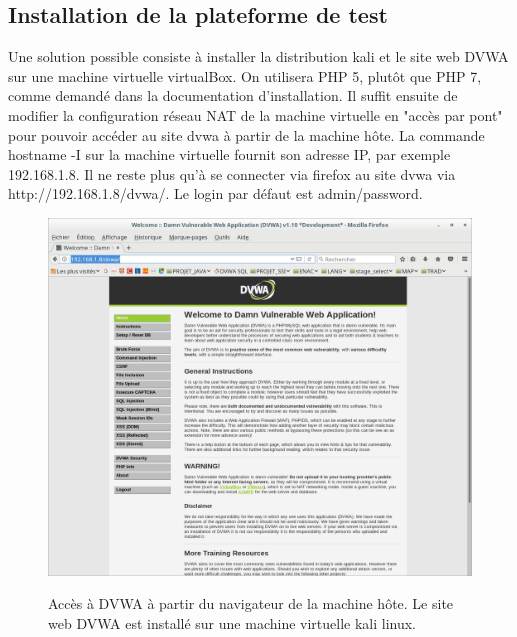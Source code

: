 \subsection*{Installation de la plateforme de test}
Une solution possible consiste à installer la distribution kali et le site web DVWA sur une machine virtuelle virtualBox. On utilisera PHP 5, plutôt que PHP 7, comme demandé dans la documentation d'installation.
Il suffit ensuite de modifier la configuration réseau NAT de la machine virtuelle en "accès par pont" pour pouvoir accéder au site dvwa à partir de la machine hôte.
La commande hostname -I sur la machine virtuelle fournit son adresse IP, par exemple 192.168.1.8. Il ne reste plus qu'à se connecter via firefox
au site dvwa via {\color{blue}http://192.168.1.8/dvwa/}. Le login par défaut est admin/password.

 \begin{figure}[!h]
 	\begin{center}
 		\label{}
 		\includegraphics[scale=\scaledvwa]{images/dvwa.png}
 		\caption{Accès à DVWA à partir du navigateur de la machine hôte. Le site web DVWA est installé sur une machine virtuelle kali linux.}
 	\end{center}
 \end{figure}


\clearpage